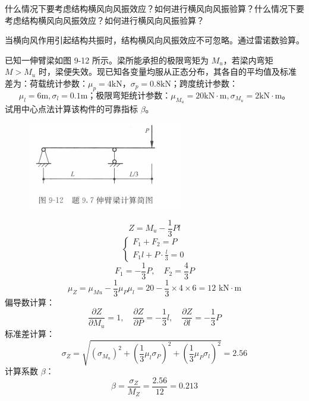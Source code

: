 \documentclass[12pt, a4paper, oneside, UTF8]{ctexbook}
\begin{document}
\begin{example}
    什么情况下要考虑结构横风向风振效应？如何进行横风向风振验算？什么情况下要考虑结构横风向风振效应？如何进行横风向风振验算？

    当横向风作用引起结构共振时，结构横风向风振效应不可忽略。通过雷诺数验算。
\end{example}



\begin{example}
已知一伸臂梁如图 9-12 所示。梁所能承担的极限弯矩为 \( M_u \)，若梁内弯矩 \( M > M_u \) 时，梁便失效。现已知各变量均服从正态分布，其各自的平均值及标准差为：荷载统计参数：\( \mu_p = 4 \text{kN} \)，\( \sigma_p = 0.8 \text{kN} \)；跨度统计参数：
\[
\mu_l = 6 \text{m}, \sigma_l = 0.1 \text{m} \text{；极限弯矩统计参数：} \mu_{M_u} = 20 \text{kN} \cdot \text{m}, \sigma_{M_u} = 2 \text{kN} \cdot \text{m} \text{。}
\]
试用中心点法计算该构件的可靠指标 \( \beta \)。

\begin{figure}[H]
\centering
\includegraphics[width=0.6\textwidth]{../figure/5.png}
\end{figure}

\[
Z = M_u - \frac{1}{3} P l
\]
\[
\begin{cases}
F_1 + F_2 = P \\
F_1 l + P \cdot \frac{l}{3} = 0
\end{cases}
\]
\[
F_1 = -\frac{1}{3} P, \quad F_2 = \frac{4}{3} P
\]
\[
\mu_Z = \mu_{Mu} - \frac{1}{3} \mu_P \mu_l = 20 - \frac{1}{3} \times 4 \times 6 = 12 \text{ kN} \cdot \text{m}
\]
偏导数计算：
\[
\frac{\partial Z}{\partial M_u} = 1, \quad \frac{\partial Z}{\partial P} =-\frac{1}{3} l, \quad \frac{\partial Z}{\partial l} = -\frac{1}{3} P
\]
标准差计算：
\[
\sigma_Z = \sqrt{
    (\sigma_{M_u})^2 + \left(\frac{1}{3} \mu_l \sigma_ P \right)^2 + \left(\frac{1}{3} \mu_P \sigma_l \right)^2
} 
= 2.56
\]
计算系数 $\beta$：
\[
\beta = \frac{\sigma_Z}{M_Z} = \frac{2.56}{12} = 0.213
\]
\end{example}

\ifx\allfiles\undefined
\end{document}
